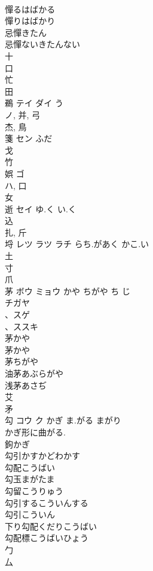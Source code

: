 \documentclass[8pt]{extreport}
\begin{document}
\begin{CJK}{UTF8}{min}
\\	憚るはばかる
\\	憚りはばかり
\\	忌憚きたん
\\	忌憚ないきたんない
\\	十 
\\	口 
\\	忙 
\\	田 
\\	鵜	テイ ダイ	う	
\\	ノ, 并, 弓 
\\	杰, 鳥 
\\	箋	セン	ふだ	
\\	戈 
\\	竹 
\\	娯	ゴ		
\\	ハ, 口 
\\	女 
\\	逝	セイ	ゆ.く い.く	
\\	込 
\\	扎, 斤 
\\	埒	レツ ラツ ラチ	らち.があく かこ.い	
\\	土 
\\	寸 
\\	爪 
\\	茅	ボウ ミョウ	かや ちがや ち じ	
\\	チガヤ 
\\	、スゲ 
\\	、ススキ 
\\	茅かや
\\	茅かや
\\	茅ちがや
\\	油茅あぶらがや
\\	浅茅あさぢ
\\	艾 
\\	矛 
\\	勾	コウ ク	かぎ ま.がる まがり	
\\	かぎ形に曲がる.
\\	鉤かぎ 
\\	勾引かすかどわかす
\\	勾配こうばい
\\	勾玉まがたま
\\	勾留こうりゅう
\\	勾引するこういんする
\\	勾引こういん
\\	下り勾配くだりこうばい
\\	勾配標こうばいひょう
\\	勹 
\\	厶 

\end{CJK}
\end{document}

